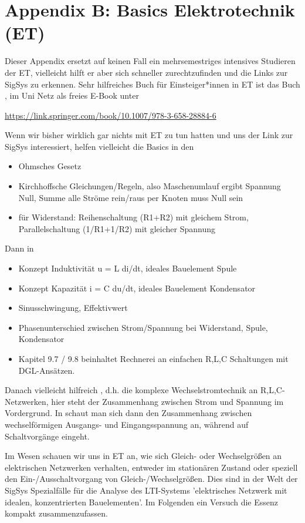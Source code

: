 \clearpage
\section{Appendix B: Basics Elektrotechnik (ET)}
%
Dieser Appendix ersetzt auf keinen Fall ein mehrsemestriges intensives Studieren
der ET, vielleicht hilft er aber sich schneller zurechtzufinden und die Links
zur SigSys zu erkennen.
%
Sehr hilfreiches Buch für Einsteiger*innen in ET ist das Buch
\cite{Marinescu2020}, im Uni Netz als freies E-Book unter

\url{https://link.springer.com/book/10.1007/978-3-658-28884-6}

\noindent Wenn wir bisher wirklich gar nichts mit ET zu tun hatten und uns
der Link zur SigSys interessiert, helfen vielleicht die Basics
in den \cite[Kapitel 1-3]{Marinescu2020}
\begin{itemize}
  \item Ohmsches Gesetz
  \item Kirchhoffsche Gleichungen/Regeln, also Maschenumlauf ergibt Spannung Null,
  Summe alle Ströme rein/raus per Knoten muss Null sein
  \item für Widerstand: Reihenschaltung (R1+R2) mit gleichem Strom,
  Parallelschaltung (1/R1+1/R2) mit gleicher Spannung
\end{itemize}
Dann in \cite[Kapitel 9]{Marinescu2020}
\begin{itemize}
\item Konzept Induktivität u = L di/dt, ideales Bauelement Spule
\item Konzept Kapazität i = C du/dt, ideales Bauelement Kondensator
\item Sinusschwingung, Effektivwert
\item Phasenunterschied zwischen Strom/Spannung bei Widerstand, Spule, Kondensator
\item Kapitel 9.7 / 9.8 beinhaltet Rechnerei an
einfachen R,L,C Schaltungen mit DGL-Ansätzen.
\end{itemize}
Danach vielleicht hilfreich \cite[Kap. 10.2 und 10.3]{Marinescu2020}, d.h.
die komplexe Wechselstromtechnik an R,L,C-Netzwerken, hier steht
der Zusammenhang zwischen Strom und Spannung im Vordergrund.
In \cite[Kap. 13]{Marinescu2020} schaut man sich dann den Zusammenhang zwischen
wechselförmigen Ausgangs- und Eingangsspannung an, während
\cite[Kap. 15]{Marinescu2020} auf Schaltvorgänge eingeht.

Im Wesen schauen wir uns in ET an, wie sich Gleich- oder Wechselgrößen
an elektrischen Netzwerken verhalten, entweder im stationären Zustand
oder speziell den Ein-/Ausschaltvorgang von Gleich-/Wechselgrößen.
%
Dies sind in der Welt der SigSys Spezialfälle für die Analyse des LTI-Systems
'elektrisches Netzwerk mit idealen, konzentrierten Bauelementen'.
%
Im Folgenden ein Versuch die Essenz kompakt zusammenzufassen.

